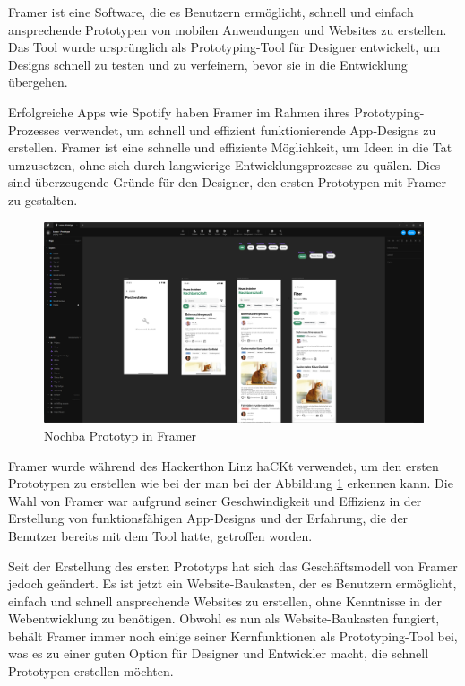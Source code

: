 Framer ist eine Software, die es Benutzern ermöglicht, schnell und einfach ansprechende Prototypen von mobilen Anwendungen und Websites zu erstellen. Das Tool wurde ursprünglich als Prototyping-Tool für Designer entwickelt, um Designs schnell zu testen und zu verfeinern, bevor sie in die Entwicklung übergehen.

Erfolgreiche Apps wie Spotify haben Framer im Rahmen ihres
Prototyping-Prozesses verwendet, um schnell und effizient
funktionierende App-Designs zu erstellen. Framer ist eine
schnelle und effiziente Möglichkeit, um Ideen in die Tat
umzusetzen, ohne sich durch langwierige Entwicklungsprozesse
zu quälen. Dies sind überzeugende Gründe für den Designer, den ersten Prototypen mit Framer zu gestalten.

\begin{figure}[h]
  \centering
  \includegraphics[width=1\textwidth]{pics/nochba-framer-prototype-screenshot.png}
  \caption{Nochba Prototyp in Framer}
  \label{fig:framer-prototype}
\end{figure}


Framer wurde während des Hackerthon Linz haCKt verwendet, um
den ersten Prototypen zu erstellen wie bei der man bei der
Abbildung \ref{fig:framer-prototype} erkennen kann. Die Wahl von Framer war
aufgrund seiner Geschwindigkeit und Effizienz in der
Erstellung von funktionsfähigen App-Designs und der
Erfahrung, die der Benutzer bereits mit dem Tool hatte,
getroffen worden.

Seit der Erstellung des ersten Prototyps hat sich das Geschäftsmodell von Framer jedoch geändert. Es ist jetzt ein Website-Baukasten, der es Benutzern ermöglicht, einfach und schnell ansprechende Websites zu erstellen, ohne Kenntnisse in der Webentwicklung zu benötigen. Obwohl es nun als Website-Baukasten fungiert, behält Framer immer noch einige seiner Kernfunktionen als Prototyping-Tool bei, was es zu einer guten Option für Designer und Entwickler macht, die schnell Prototypen erstellen möchten.

